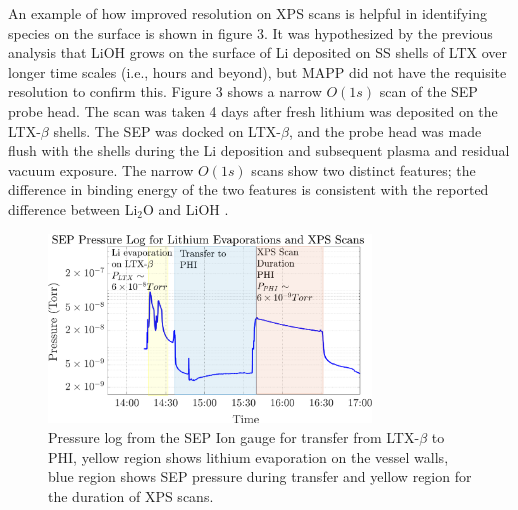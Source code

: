 \documentclass[aip,rsi,amsmath,amssymb,reprint]{revtex4-1}
\begin{document}
An example of how improved resolution on XPS scans is helpful in identifying species on the surface is shown in figure 3. It was hypothesized by the previous analysis that LiOH grows on the surface of Li deposited on SS shells of LTX over longer time scales (i.e., hours and beyond), but MAPP did not have the requisite resolution to confirm this. Figure 3 shows a narrow $O(1s)$ scan of the SEP probe head. The scan was taken 4 days after fresh lithium was deposited on the LTX-$\beta$ shells. The SEP was docked on LTX-$\beta$, and the probe head was made flush with the shells during the Li deposition and subsequent plasma and residual vacuum exposure. The narrow $O(1s)$ scans show two distinct features; the difference in binding energy of the two features is consistent with the reported difference between Li$_2$O and LiOH \cite{o1s_delta}. 

\begin{figure}%
\centering
\includegraphics[width=3.37in,keepaspectratio]{04012019_Transferlog}%
\caption{Pressure log from the SEP Ion gauge for transfer from LTX-$\beta$ to PHI, yellow region shows lithium evaporation on the vessel walls, blue region shows SEP pressure during transfer and yellow region for the duration of XPS scans.}
\end{figure}
\end{document}
